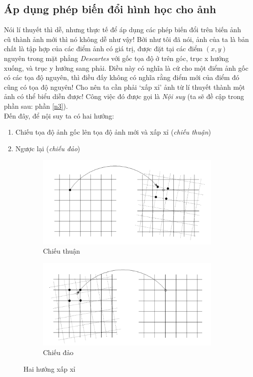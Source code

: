 \documentclass{article}
\begin{document}
\subsection{Áp dụng phép biến đổi hình học cho ảnh}
Nói lí thuyết thì dễ, nhưng thực tế để áp dụng các phép biến đổi trên biến ảnh cũ thành ảnh mới thì nó không dễ như vậy! Bởi như tôi đã nói, ảnh của ta là bản chất là tập hợp của các điểm ảnh có giá trị, được đặt tại các điểm $(x,y)$ nguyên trong mặt phẳng \textit{Descartes} với gốc tọa độ ở trên góc, trục x hướng xuống, và trục y hướng sang phải. Điều này có nghĩa là cứ cho một điểm ảnh gốc có các tọa độ nguyên, thì điều đấy không có nghĩa rằng điểm mới của điểm đó cũng có tọa độ nguyên! Cho nên ta cần phải `xấp xỉ' ảnh từ lí thuyết thành một ảnh có thể biểu diễn được! Công việc đó được gọi là \textit{Nội suy} (ta sẽ đề cập trong phần sau: phần \ref{n3}).\\
Đến đây, để nội suy ta có hai hướng:
\begin{enumerate}
    \item Chiếu tọa độ ảnh gốc lên tọa độ ảnh mới và xấp xỉ (\textit{chiếu thuận})
    \item Ngược lại (\textit{chiếu đảo})
\end{enumerate}
\begin{figure}[ht!]
    \centering
    \begin{subfigure}[b]{0.8\linewidth}
        \includegraphics[width = \linewidth]{fig11a.png}
        \caption{Chiếu thuận}
    \end{subfigure}
    \begin{subfigure}[b]{0.8\linewidth}
        \includegraphics[width = \linewidth]{fig11b.png}
        \caption{Chiếu đảo}
    \end{subfigure}
    \caption{Hai hướng xấp xỉ}
    \label{fig11}
\end{figure}
\end{document}
